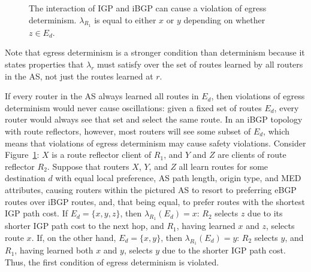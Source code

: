 \begin{figure}
\centering
\begin{psfrags}
%
%
\end{psfrags}
\caption[The interaction of IGP and iBGP can cause a violation of egress
  determinism.]{The interaction of IGP and iBGP can cause a violation of egress
  determinism. $\lambda_{R_1}$ is equal to either $x$ or $y$ depending
  on whether $z \in E_d$.}
\label{fig:det_violation_rr}
\end{figure}

Note that egress determinism is a stronger condition than determinism
because it states
properties that $\lambda_r$ must satisfy over the set of routes learned
by all routers in the AS, not just the routes learned at $r$.

If every router in the AS always learned all routes in $E_d$, then
violations of egress determinism would never cause oscillations: given a
fixed set of routes $E_d$, every router would always see that set and
select the same route.  In an iBGP topology with route reflectors,
however, most routers will see some subset of $E_d$, which means that
violations of egress determinism may cause safety violations.  Consider
Figure~\ref{fig:det_violation_rr}: $X$ is a route reflector client of
$R_1$, and $Y$ and $Z$ are clients of route reflector $R_2$. Suppose
that routers $X$, $Y$, and $Z$ all learn routes for some destination $d$
with equal local preference, AS path length, origin type, and MED
attributes, causing routers within the pictured AS to resort to
preferring eBGP routes over iBGP routes, and, that being equal, to
prefer routes with the shortest IGP path cost.  If $E_d = \{x,y,z\}$,
then $\lambda_{R_1}(E_d) = x$: $R_2$ selects $z$ due to its shorter IGP
path cost to the next hop, and $R_1$, having learned $x$ and $z$,
selects route $x$.  If, on the other hand, $E_d = \{x,y\}$, then
$\lambda_{R_1}(E_d) = y$: $R_2$ selects $y$, and $R_1$, having learned
both $x$ and $y$, selects $y$ due to the shorter IGP path cost. Thus,
the first condition of egress determinism is violated.

